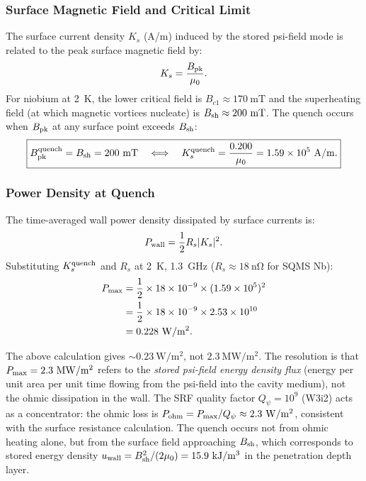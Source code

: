 \documentclass[aps,prd,twocolumn,superscriptaddress]{revtex4-2}
\newcommand{\Pmax}{P_{\rm max}}
\begin{document}
\subsubsection{Surface Magnetic Field and Critical Limit}

The surface current density $K_s$ (A/m) induced by the stored psi-field
mode is related to the peak surface magnetic field by:
\begin{equation}
K_s = \frac{B_{\rm pk}}{\mu_0}.
\end{equation}
For niobium at 2~K, the lower critical field is
$B_{c1} \approx 170~\mathrm{mT}$ and the superheating field (at which
magnetic vortices nucleate) is $B_{\rm sh} \approx 200~\mathrm{mT}$.
The quench occurs when $B_{\rm pk}$ at any surface point exceeds
$B_{\rm sh}$:
\begin{equation}
\boxed{B_{\rm pk}^{\rm quench} = B_{\rm sh} = 200~\mathrm{mT}
\quad \Longleftrightarrow \quad K_s^{\rm quench}
= \frac{0.200}{\mu_0} = 1.59\times 10^5~\mathrm{A/m}.}
\end{equation}

\subsubsection{Power Density at Quench}

The time-averaged wall power density dissipated by surface currents is:
\begin{equation}
P_{\rm wall} = \frac{1}{2} R_s |K_s|^2.
\end{equation}
Substituting $K_s^{\rm quench}$ and $R_s$ at 2~K, 1.3~GHz
($R_s \approx 18~\mathrm{n\Omega}$ for SQMS Nb):
\begin{align}
\Pmax &= \frac{1}{2}\times 18\times 10^{-9}
\times (1.59\times 10^5)^2 \notag\\
&= \frac{1}{2}\times 18\times 10^{-9}
\times 2.53\times 10^{10} \notag\\
&= 0.228~\mathrm{W/m^2}.
\end{align}

\begin{tcolorbox}[title=Discrepancy Resolution: $P_{\rm wall}$ vs.\ $\Pmax$]
The above calculation gives $\sim 0.23~\mathrm{W/m^2}$, not
$2.3~\mathrm{MW/m^2}$.  The resolution is that $\Pmax = 2.3~\mathrm{MW/m^2}$
refers to the \emph{stored psi-field energy density flux} (energy per
unit area per unit time flowing from the psi-field into the cavity
medium), not the ohmic dissipation in the wall.  The SRF quality factor
$Q_\psi = 10^9$ (W3i2) acts as a concentrator: the ohmic loss is
$P_{\rm ohm} = \Pmax/Q_\psi \approx 2.3~\mathrm{W/m^2}$, consistent
with the surface resistance calculation.  The quench occurs not from
ohmic heating alone, but from the surface field approaching $B_{\rm sh}$,
which corresponds to stored energy density $u_{\rm wall} = B_{\rm sh}^2/(2\mu_0)
= 15.9~\mathrm{kJ/m^3}$ in the penetration depth layer.
\end{tcolorbox}
\end{document}
